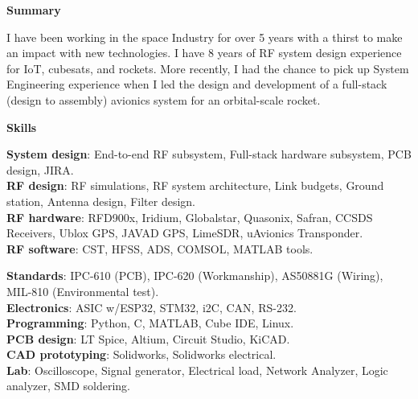 \documentclass[10pt, Letter]{article}
\newcommand{\cvsection}[1]
{
	\begin{center}
		\large\textcolor{sectcol}{\textbf{#1}}
	\end{center}
}
\begin{document}
\cvsection{Summary}
\vspace{-5pt}
I have been working in the space Industry for over 5 years with a thirst to make an impact with new technologies. I have 8 years of RF system design experience for IoT, cubesats, and rockets. More recently, I had the chance to pick up System Engineering experience when I led the design and development of a full-stack (design to assembly) avionics system for an orbital-scale rocket. 
\vspace{-2pt}
\cvsection{Skills}
\vspace{-15pt}
\begin{multicols}{2}
\textbf{System design}: End-to-end RF subsystem, Full-stack hardware subsystem, PCB design, JIRA. \\
\textbf{RF design}: RF simulations, RF system architecture, Link budgets, Ground station, Antenna design, Filter design. \\
\textbf{RF hardware}: RFD900x, Iridium, Globalstar, Quasonix, Safran, CCSDS Receivers, Ublox GPS, JAVAD GPS, LimeSDR, uAvionics Transponder. \\
\textbf{RF software}: CST, HFSS, ADS, COMSOL, MATLAB tools.

\columnbreak

\textbf{Standards}: IPC-610 (PCB), IPC-620 (Workmanship), AS50881G (Wiring), MIL-810 (Environmental test). \\
\textbf{Electronics}: ASIC w/ESP32, STM32, i2C, CAN, RS-232. \\
\textbf{Programming}: Python, C, MATLAB, Cube IDE, Linux. \\
\textbf{PCB design}: LT Spice, Altium, Circuit Studio, KiCAD. \\
\textbf{CAD prototyping}: Solidworks, Solidworks electrical. \\
\textbf{Lab}: Oscilloscope, Signal generator, Electrical load, Network Analyzer, Logic analyzer, SMD soldering. 
\end{multicols}

%
%

\end{document}
